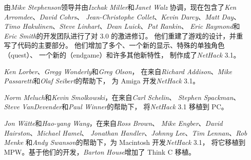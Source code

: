 \documentclass[a4paper, 10pt]{article}
\newcommand{\nd}{\noindent}
\begin{document}
\medskip
由{\it Mike Stephenson\/}领导并由{\it Izchak Miller\/}和{\it Janet Walz}
协调，现在包含了{\it Ken Arromdee}、{\it David Cohrs}、
{\it Jean-Christophe Collet}、{\it Kevin Darcy}、{\it Matt Day}、
{\it Timo Hakulinen}、{\it Steve Linhart}、{\it Dean Luick}、{\it Pat Rankin}、
{\it Eric Raymond}和{\it Eric Smith\/}的开发团队进行了对 3.0 的激进修订。
他们重建了游戏的设计，并重写了代码的主要部分。
他们增加了多个\zhTransDungeon{}、一个新的显示、特殊的单独角色\zhTransQuest（quest）、
一个新的\zhTransEndgame（endgame）和许多其他新特性，
制作成了{\it NetHack\/} 3.1。

\medskip
{\it Ken Lorber}、{\it Gregg Wonderly\/}和{\it Greg Olson}，
在来自{\it Richard Addison}、{\it Mike Passaretti}和{\it Olaf Seibert}的帮助下，
为 Amiga 开发{\it NetHack\/} 3.1。

\medskip
{\it Norm Meluch\/}和{\it Kevin Smolkowski}，在来自{\it Carl Schelin}、
{\it Stephen Spackman}、{\it Steve VanDevender}和{\it Paul Winner}的帮助下，
将{\it NetHack\/} 3.1 移植到 PC。

\medskip
{\it Jon Wätte}和{\it Hao-yang Wang}，在来自{\it Ross Brown}、
{\it Mike Engber}、{\it David Hairston}、{\it Michael Hamel}、
{\it Jonathan Handler}、{\it Johnny Lee}、{\it Tim Lennan}、{\it Rob Menke}
和{\it Andy Swanson}的帮助下，为 Macintosh 开发{\it NetHack\/} 3.1，
将它移植到 MPW。基于他们的开发，{\it Barton House}增加了 Think C 移植。
\end{document}
